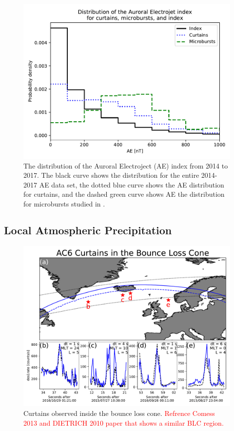 \documentclass[draft]{agujournal2019}
\begin{document}
\begin{figure}
\includegraphics[width=\textwidth]{ac6_curtain_microburst_AE_dist.pdf}
\caption{The distribution of the Auroral Electroject (AE) index from 2014 to 2017. The black curve shows the distribution for the entire 2014-2017 AE data set, the dotted blue curve shows the AE distribution for curtains, and the dashed green curve shows AE the distribution for microbursts studied in .}
\label{ae_dist}
\end{figure}

\subsection{Local Atmospheric Precipitation}
\begin{figure}
\includegraphics[width=\textwidth]{fig3.pdf}
\caption{Curtains observed inside the bounce loss cone. \textcolor{red}{Refrence Comess 2013 and DIETRICH 2010 paper that shows a similar BLC region.}}
\label{fig3}
\end{figure}
\end{document}
